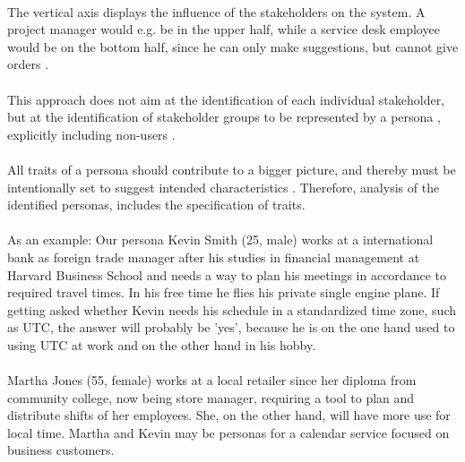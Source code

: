\paragraph{} The vertical axis displays the influence of the stakeholders on the system. A project manager would e.g. be in the upper half, while a service desk employee would be on the bottom half, since he can only make suggestions, but cannot give orders \parencite[cf.][38]{Robier.2016}. 

\paragraph{} This approach does not aim at the identification of each individual stakeholder, but at the identification of stakeholder groups to be represented by a persona \parencite[cf.][82]{Cooper.2007}, explicitly  including non-users \parencite[cf.][84]{Cooper.2007}.

\paragraph{} All traits of a persona should contribute to a bigger picture, and thereby must be intentionally set to suggest intended characteristics \parencite[cf.]{Platt.2016}. Therefore, analysis of the identified personas, includes the specification of traits. 

\paragraph{} As an example: Our persona Kevin Smith (25, male) works at a international bank as foreign trade manager after his studies in financial management at Harvard Business School and needs a way to plan his meetings in accordance to required travel times. In his free time he flies his private single engine plane. If getting asked  whether Kevin needs his schedule in a standardized time zone, such as UTC, the answer will probably be 'yes', because he is on the one hand used to using UTC at work and on the other hand in his hobby. 

\paragraph{} Martha Jones (55, female) works at a local retailer since her diploma from community college, now being store manager, requiring a tool to plan and distribute shifts of her employees. She, on the other hand, will have more use for local time. Martha and Kevin may be personas for a calendar service focused on business customers. 

